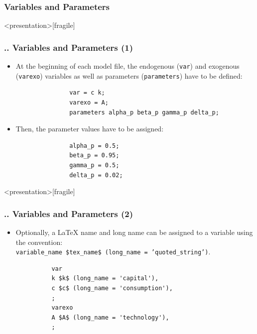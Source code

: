 \documentclass[11pt,aspectratio=169]{beamer}
\begin{document}
\subsubsection{Variables and Parameters}
\begin{frame}<presentation>[fragile]
	\frametitle{{\thesection.\thesubsection.\thesubsubsection} Variables and Parameters (1)}
	\begin{itemize}
		\justifying
		\item At the beginning of each model file, the endogenous (\texttt{var}) and exogenous (\texttt{varexo}) variables as well as parameters (\texttt{parameters}) have to be defined:
			\begin{verbatim}
			   var = c k;		
			   varexo = A;		
			   parameters alpha_p beta_p gamma_p delta_p;	
			\end{verbatim}	
		\item Then, the parameter values have to be assigned:
			\begin{verbatim}				
			   alpha_p = 0.5;
			   beta_p = 0.95;
			   gamma_p = 0.5;
			   delta_p = 0.02;
			\end{verbatim}
	\end{itemize}
\end{frame}
\begin{frame}<presentation>[fragile]
	\frametitle{{\thesection.\thesubsection.\thesubsubsection} Variables and Parameters (2)}
	\begin{itemize}
		\item Optionally, a LaTeX name and long name can be assigned to a variable using the convention:\\ \texttt{variable\_name \$tex\_name\$ (long\_name = 'quoted\_string')}.
		\begin{verbatim}
		  var 
		  k $k$ (long_name = 'capital'),
		  c $c$ (long_name = 'consumption'),
		  ;
		  varexo 
		  A $A$ (long_name = 'technology'),
		  ;
		\end{verbatim}
	\end{itemize}
\end{frame}
\end{document}
